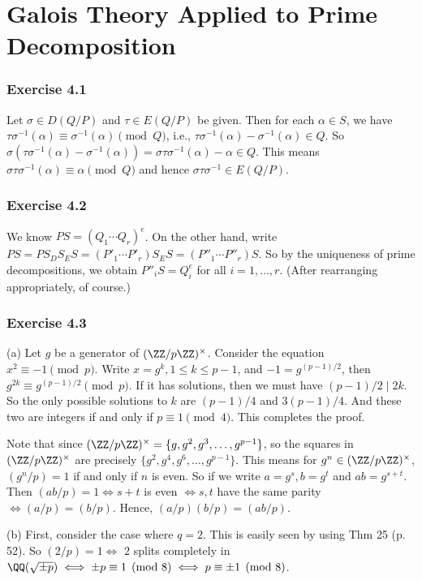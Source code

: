 \documentclass[../Chapter.tex]{subfiles}
\begin{document}
\chapter{Galois Theory Applied to Prime Decomposition}

\subsection*{Exercise 4.1}

Let $\sigma\in D(Q/P)$ and $\tau\in E(Q/P)$ be given. Then for each $\alpha\in S$, we have $\tau\sigma^{-1}(\alpha)\equiv \sigma^{-1}(\alpha) \pmod{Q}$, i.e., $\tau\sigma^{-1}(\alpha)-\sigma^{-1}(\alpha)\in Q$. So $\sigma(\tau\sigma^{-1}(\alpha)-\sigma^{-1}(\alpha))=\sigma\tau\sigma^{-1}(\alpha)-\alpha \in Q$. This means $\sigma\tau\sigma^{-1}(\alpha) \equiv \alpha \pmod{Q}$ and hence $\sigma\tau\sigma^{-1}\in E(Q/P)$.

\subsection*{Exercise 4.2}

We know $PS=(Q_1\cdots Q_r)^e$. On the other hand, write $PS=PS_DS_ES=(P'_1\cdots P'_r)S_ES=(P''_1\cdots P''_r)S$. So by the uniqueness of prime decompositions, we obtain $P''_iS=Q_i^e$ for all $i=1,\ldots,r$. (After rearranging appropriately, of course.)

\subsection*{Exercise 4.3}

(a) Let $g$ be a generator of $(\ZZ/p\ZZ)^\times$. Consider the equation $x^2\equiv -1\pmod{p}$. Write $x=g^k,1\leq k\leq p-1$, and $-1=g^{(p-1)/2}$, then $g^{2k}\equiv g^{(p-1)/2}\pmod{p}$. If it has solutions, then we must have $(p-1)/2\mid 2k$. So the only possible solutions to $k$ are $(p-1)/4$ and $3(p-1)/4$. And these two are integers if and only if $p\equiv 1\pmod{4}$. This completes the proof.

Note that since $(\ZZ/p\ZZ)^\times=\{g,g^2,g^3,\ldots,g^{p-1}\}$, so the squares in $(\ZZ/p\ZZ)^\times$ are precisely $\{g^2,g^4,g^6,\ldots,g^{p-1}\}$. This means for $g^n\in(\ZZ/p\ZZ)^\times$, $(g^n/p)=1$ if and only if $n$ is even. So if we write $a=g^s,b=g^t$ and $ab=g^{s+t}$. Then $(ab/p)=1 \iff s+t$ is even $\iff s,t$ have the same parity $\iff (a/p)=(b/p)$. Hence, $(a/p)(b/p)=(ab/p)$.

(b) First, consider the case where $q=2$. This is easily seen by using Thm 25 (p. 52). So $(2/p)=1 \iff$ $2$ splits completely in $\QQ(\sqrt{\pm p}) \iff \pm p\equiv 1 \pmod{8} \iff p\equiv \pm1 \pmod{8}$.
\end{document}
